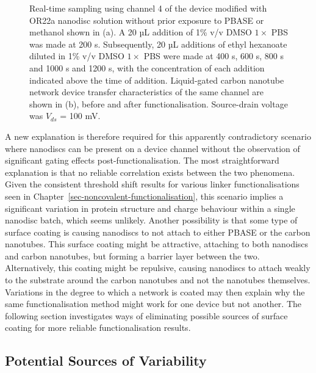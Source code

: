 \documentclass[
  a4paper,
]{scrbook}
\begin{document}
\begin{figure}
\begin{minipage}[t]{0.01\linewidth}
{}

\end{minipage}%

\caption[Real-time sampling using a channel modified with OR22a nanodisc
solution without prior exposure to PBASE or methanol, alongside
liquid-gated transfer characteristics of the same
channel.]{\label{fig-OR22a-variability-noPBASE}Real-time sampling using
channel 4 of the device modified with OR22a nanodisc solution without
prior exposure to PBASE or methanol shown in (a). A 20 µL addition of
1\% v/v DMSO \(1 \times\) PBS was made at 200 s. Subsequently, 20 µL
additions of ethyl hexanoate diluted in 1\% v/v DMSO \(1 \times\) PBS
were made at 400 s, 600 s, 800 s and 1000 s and 1200 s, with the
concentration of each addition indicated above the time of addition.
Liquid-gated carbon nanotube network device transfer characteristics of
the same channel are shown in (b), before and after functionalisation.
Source-drain voltage was \(V_{ds}\) = 100 mV.}

\end{figure}

A new explanation is therefore required for this apparently
contradictory scenario where nanodiscs can be present on a device
channel without the observation of significant gating effects
post-functionalisation. The most straightforward explanation is that no
reliable correlation exists between the two phenomena. Given the
consistent threshold shift results for various linker functionalisations
seen in Chapter~\ref{sec-noncovalent-functionalisation}, this scenario
implies a significant variation in protein structure and charge
behaviour within a single nanodisc batch, which seems unlikely. Another
possibility is that some type of surface coating is causing nanodiscs to
not attach to either PBASE or the carbon nanotubes. This surface coating
might be attractive, attaching to both nanodiscs and carbon nanotubes,
but forming a barrier layer between the two. Alternatively, this coating
might be repulsive, causing nanodiscs to attach weakly to the substrate
around the carbon nanotubes and not the nanotubes themselves. Variations
in the degree to which a network is coated may then explain why the same
functionalisation method might work for one device but not another. The
following section investigates ways of eliminating possible sources of
surface coating for more reliable functionalisation results.

\hypertarget{sec-contamination}{%
\subsection{Potential Sources of Variability}\label{sec-contamination}}
\end{document}
